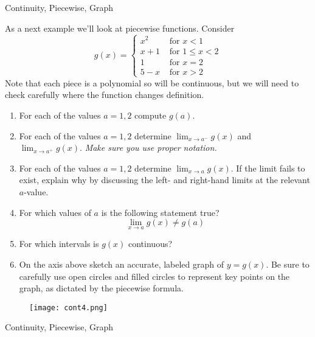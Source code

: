 \begin{tagblock}{Continuity, Piecewise, Graph}
\begin{question}
	
As a next example we'll look at piecewise functions.  Consider
\[ g(x) = \begin{cases} 
x^2 & \text{ for }  x< 1 \\
x+1 & \text{ for }  1 \leq x< 2 \\
1 &  \text{ for } x=2 \\
5-x & \text{ for } x>2 \end{cases}\]
Note that each piece is a polynomial so will be continuous, but we will need to check carefully where the function changes definition.

\begin{enumerate}
\item For each of the values $a= 1,2$ compute $g(a)$.
\vspace{.5in}

\item  For each of the values $a= 1,2$ determine $\lim_{x \to a^-} g(x)$ and  $\lim_{x \to a^+} g(x)$.  \emph{Make sure you use proper notation.}

\vspace{1.5in}


\item For each of the values $a= 1,2$ determine $\lim_{x \to a} g(x)$. If the limit fails to exist, explain why by discussing the left- and right-hand limits at the relevant $a$-value.

\vspace{1.5in}

\item For which values of $a$ is the following statement true?
\[\lim_{x \to a} g(x) \neq g(a)\]

\vspace{.5in}


\item For which intervals is $g(x)$ continuous?
\vspace{.5in}

\item On the axis above sketch an accurate, labeled graph of $y=g(x)$. Be sure to carefully use open circles and filled circles to represent key points on the graph, as dictated by the piecewise formula.
\end{enumerate}

\begin{figure}[h]
\centering
\texttt{[image: cont4.png]}
\end{figure}
	
\begin{tags}
	   Continuity, Piecewise, Graph
\end{tags}
	
\begin{diary}
	  
\end{diary}


	

	\end{question}
	
	\end{tagblock}




